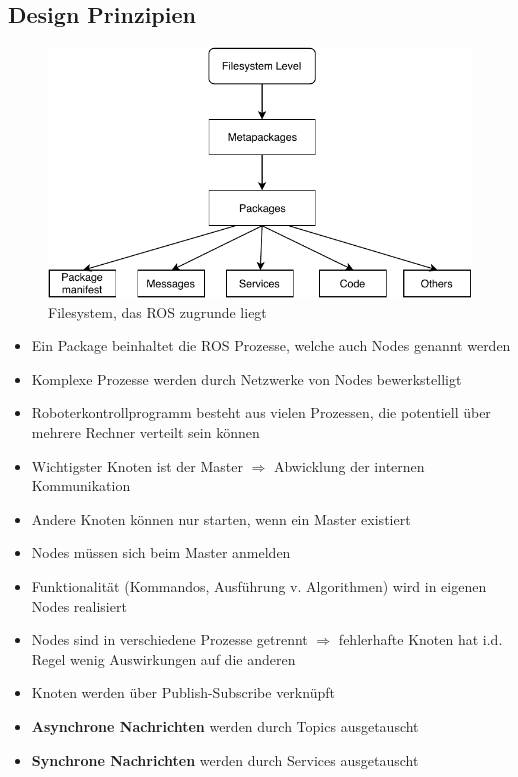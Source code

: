 \subsection{Design Prinzipien}
\begin{figure}[H]
	\begin{center}
		\includegraphics[]{Resources/PDF/FileSystem}
		\caption{Filesystem, das ROS zugrunde liegt}
		\label{fig:PDF/FileSystem}
	\end{center}
\end{figure}
\begin{itemize}
	\item Ein Package beinhaltet die ROS Prozesse, welche auch Nodes genannt werden
	\item Komplexe Prozesse werden durch Netzwerke von Nodes bewerkstelligt
	\item Roboterkontrollprogramm besteht aus vielen Prozessen, die potentiell über mehrere Rechner verteilt sein können
	\item Wichtigster Knoten ist der Master $\Rightarrow$ Abwicklung der internen Kommunikation
	\item Andere Knoten können nur starten, wenn ein Master existiert
	\item Nodes müssen sich beim Master anmelden
	\item Funktionalität (Kommandos, Ausführung v. Algorithmen) wird in eigenen Nodes realisiert
	\item Nodes sind in verschiedene Prozesse getrennt $\Rightarrow$ fehlerhafte Knoten hat i.d. Regel wenig Auswirkungen auf die anderen
	\item Knoten werden über Publish-Subscribe verknüpft
	\item \textbf{Asynchrone Nachrichten} werden durch Topics ausgetauscht
	\item \textbf{Synchrone Nachrichten} werden durch Services ausgetauscht
\end{itemize}
